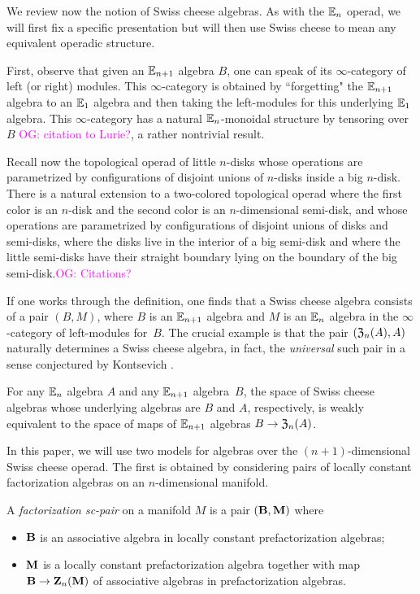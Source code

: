 \documentclass[11pt]{amsart}
\numberwithin{equation}{section}
\def\owen{\textcolor{magenta}{OG: }\textcolor{magenta}}
\begin{document}
We review now the notion of Swiss cheese algebras.
As with the $\mathbb E_n$ operad, we will first fix a specific presentation but will then use Swiss cheese to mean any equivalent operadic structure.

First, observe that given an $\mathbb E_{n+1}$ algebra $B$, 
one can speak of its $\infty$-category of left (or right) modules.
This $\infty$-category is obtained by ``forgetting" the $\mathbb E_{n+1}$ algebra to an $\mathbb E_1$ algebra and then taking the left-modules for this underlying $\mathbb E_1$ algebra.
This $\infty$-category has a natural $\mathbb E_n$-monoidal structure by tensoring over~$B$
\owen{citation to Lurie?}, a rather nontrivial result.

Recall now the topological operad of little $n$-disks whose operations are parametrized by configurations of disjoint unions of $n$-disks inside a big $n$-disk.
There is a natural extension to a two-colored topological operad where the first color is an $n$-disk and the second color is an $n$-dimensional semi-disk, 
and whose operations are parametrized by configurations of disjoint unions of disks and semi-disks, where the disks live in the interior of a big semi-disk and where the little semi-disks have their straight boundary lying on the boundary of the big semi-disk.\owen{Citations?}

If one works through the definition, one finds that a Swiss cheese algebra consists of  a pair $(B, M)$, 
where $B$ is an $\mathbb E_{n+1}$ algebra and $M$ is an $\mathbb E_n$ algebra in the $\infty$-category of left-modules for~$B$.
The crucial example is that the pair $(\mathfrak Z_{n} (A), A)$ naturally determines a Swiss cheese algebra, 
in fact, the {\em universal} such pair in a sense conjectured by Kontsevich \cite{}.

\begin{thm} 
For any $\mathbb E_n$ algebra $A$ and any $\mathbb E_{n+1}$ algebra~$B$,
the space of Swiss cheese algebras whose underlying algebras are $B$ and $A$, respectively,
is weakly equivalent to the space of maps of $\mathbb E_{n+1}$ algebras $B \to \mathfrak Z_n(A)$. 
\end{thm}

In this paper, we will use two models for algebras over the $(n+1)$-dimensional Swiss cheese operad. 
The first is obtained by considering pairs of locally constant factorization algebras on an $n$-dimensional manifold. 

\begin{dfn}
\label{dfn:pair}
A {\em factorization sc-pair} on a manifold $M$ is a pair $(\mathbf B, \mathbf M)$ where
\begin{itemize}
\item $\mathbf B$ is an associative algebra in locally constant prefactorization algebras;
\item $\mathbf M$ is a locally constant prefactorization algebra together with map $\mathbf B \to \mathbf Z_n(\mathbf M)$ of associative algebras in prefactorization algebras.
\end{itemize}
\end{dfn}
\end{document}
